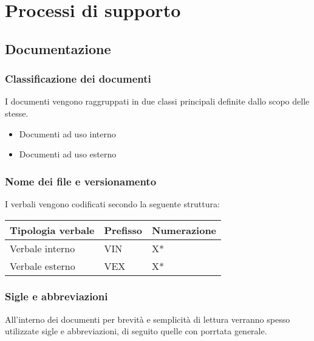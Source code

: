 \chapter{Processi di supporto}

\section{Documentazione}

\subsection{Classificazione dei documenti}

I documenti vengono raggruppati in due classi principali definite dallo scopo delle stesse.

\begin{itemize}
    \item Documenti ad uso interno
    \item Documenti ad uso esterno
\end{itemize}

\subsection{Nome dei file e versionamento}



I verbali vengono codificati secondo la seguente struttura:

\begin{center}
    \begin{tabularx}{\linewidth}{l | l | X}
        \textbf{Tipologia verbale} & \textbf{Prefisso} & \textbf{Numerazione}\\
        \hline
        Verbale interno & VIN & X* \\
        Verbale esterno & VEX & X* \\
    \end{tabularx}
\end{center}

\subsection{Sigle e abbreviazioni}

All'interno dei documenti per brevità e semplicità di lettura verranno spesso utilizzate sigle e abbreviazioni, di seguito quelle con porrtata generale.

